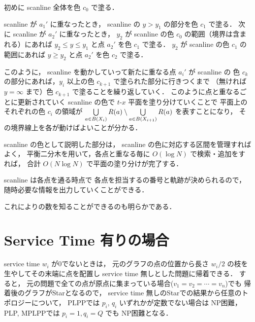 初めに scanline 全体を色 $c_0$ で塗る．

scanline が $a_1'$ に重なったとき，
scanline の $y > y_1$ の部分を色 $c_1$ で塗る．
次に scanline が $a_2'$ に重なったとき，
$y_2$ が scanline の色 $c_0$ の範囲（境界は含まれる）にあれば
$y_2 \leq y \leq y_1$ と点 $a_2'$ を色 $c_1$ で塗る．
$y_2$ が scanline の色 $c_1$ の範囲にあれば
$y \geq y_2$ と点 $a_2'$ を色 $c_2$ で塗る．


このように，
scanline を動かしていって新たに重なる点 $a_i'$ が scanline の
色 $c_k$ の部分にあれば，$y_i$ 以上の色 $c_{k + 1}$ で塗られた部分に行きつくまで
（無ければ $y = \infty$ まで）色 $c_{k + 1}$ で塗ることを繰り返していく．
このように点と重なるごとに更新されていく scanline の色で $t$-$x$ 平面を塗り分けていくことで
平面上のそれぞれの色 $c_i$ の領域が
$\bigcup\limits_{a \in B(X_i)} R(a) \setminus \bigcup\limits_{a \in B(X_{i + 1})} R(a)$
を表すことになり，
その境界線上を各\server が動けばよいことが分かる．

scanline の色として説明した部分は，
scanline の色に対応する区間を管理すればよく，
平衡二分木を用いて，各点と重なる毎に $O(\log N)$ で検索・追加をすれば，
合計 $O(N \log N)$ で平面の塗り分けが完了する．

scanline は各点を通る時点で
各点を担当する\server の番号と軌跡が決められるので，
随時必要な情報を出力していくことができる．

これにより\server の数を知ることができるのも明らかである．








\section{Service Time 有りの場合}
service time $w_i$ が0でないときは，
元のグラフの点の位置から長さ $w_i / 2$ の枝を生やしてその末端に点を配置し
service time 無しとした問題に帰着できる．
すると，
元の問題で全ての点が原点に集まっている場合($v_1 = v_2 = \cdots = v_n$)でも
帰着後のグラフがStarとなるので，
service time 無しのStarでの結果から任意のトポロジーについて，
PLPPでは $p_i$, $q_i$ いずれかが定数でない場合は NP困難，
PLP, MPLPPでは $p_i = 1, q_i = Q$ でも NP困難となる．

